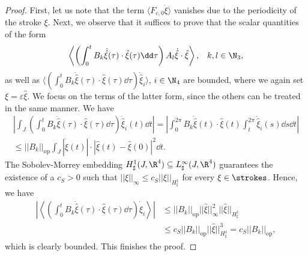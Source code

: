 \begin{proof}
First, let us note that the term $\langle F_{c,0} \dot{\xi} \rangle$ vanishes due to the periodicity of the stroke $\xi$. Next, we observe that it suffices to prove that the scalar quantities of the form 
\begin{align}
\left \langle \left ( \int_{0}^{t} B_k \dot{\hat{\xi}}(\tau)  \cdot \hat{\xi}(\tau) \dd \tau \right ) A_l \dot{\hat{\xi}} \cdot \hat{\xi} \right  \rangle, & & k,l \in \N_3,
\end{align}
as well as $ \langle  ( \int_{0}^{t} B_k \dot{\hat{\xi}}(\tau)  \cdot \hat{\xi}(\tau) \dd \tau  )\dot{\hat{\xi}}_i  \rangle$, $i \in \N_4$ are bounded, where we again set $\xi = \varepsilon \hat{\xi}$. We focus on the terms of the latter form, since the others can be treated in the same manner. We have
\begin{equation}
\begin{aligned}
\left |\int_J \left ( \int_{0}^{t} B_k \dot{\hat{\xi}}(\tau) \cdot \hat{\xi}(\tau) \dd \tau\right ) \dot{\hat{\xi}}_i(t) \dd t \right | = \left | \int_{0}^{2\pi} B_k \dot{\hat{\xi}}(t) \cdot \hat{\xi}(t) \int_{t}^{2 \pi} \dot{\hat{\xi}}_i(s) \dd s \dd t \right |\\
\leq ||B_k||_{\mathrm{op}} \int_{J} |\dot{\hat{\xi}}(t)| \cdot |\hat{\xi}(t) - \hat{\xi}(0)|^2 \dd t.
\end{aligned}
\end{equation}
The Sobolev-Morrey embedding $H_\sharp^{1}(J, \R^4) \subseteq L^\infty_{\sharp}(J, \R^4)$ guarantees the existence of a $c_S > 0$ such that $||\xi||_{\infty} \leq c_S ||\xi||_{H_\sharp^1}$ for every $\xi \in \strokes$. Hence, we have
\begin{equation}
\begin{aligned}
\left | \left \langle \left  ( \int_{0}^{t} B_k \dot{\hat{\xi}}(\tau)  \cdot \hat{\xi}(\tau) \dd \tau  \right )\dot{\hat{\xi}}_i \right  \rangle\right |
& \leq ||B_k||_{\mathrm{op}} ||\hat{\xi}||_{\infty}^2 ||\hat{\xi}||_{H_\sharp^1}\\
&\leq c_S ||B_k||_{\mathrm{op}} ||\hat{\xi}||_{H_\sharp^1}^3 = c_S ||B_k||_{\mathrm{op}},
\end{aligned}
\end{equation}
which is clearly bounded. This finishes the proof.
\end{proof}

